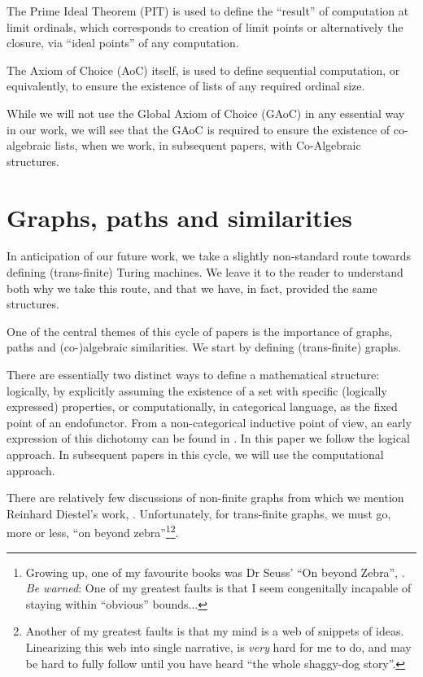 \documentclass[a4paper,openany]{amsart}
\begin{document}
The Prime Ideal Theorem (PIT) is used to define the ``result'' of computation at
limit ordinals, which corresponds to creation of limit points or alternatively
the closure, via ``ideal points'' of any computation.

The Axiom of Choice (AoC) itself, is used to define sequential computation, or
equivalently, to ensure the existence of lists of any required ordinal size.

While we will not use the Global Axiom of Choice (GAoC) in any essential way in
our work, we will see that the GAoC is required to ensure the existence of
co-algebraic lists, when we work, in subsequent papers, with Co-Algebraic
structures.

\section{Graphs, paths and similarities}

In anticipation of our future work, we take a slightly non-standard route towards defining
(trans-finite) Turing machines. We leave it to the reader to understand both why we take
this route, and that we have, in fact, provided the same structures.

One of the central themes of this cycle of papers is the importance of graphs, paths and
(co-)algebraic similarities. We start by defining (trans-finite) graphs.

There are essentially two distinct ways to define a mathematical structure: logically, by
explicitly assuming the existence of a set with specific (logically expressed) properties,
or computationally, in categorical language, as the fixed point of an endofunctor. From a
non-categorical inductive point of view, an early expression of this dichotomy can be
found in \cite[page 1]{moschovakis1974induction}. In this paper we follow the logical
approach. In subsequent papers in this cycle, we will use the computational approach.

There are relatively few discussions of non-finite graphs from which we mention Reinhard
Diestel's work, \cite{diestel2006graphTheory, diestel1990infiniteGraphTheory}.
Unfortunately, for trans-finite graphs, we must go, more or less, ``on beyond
zebra''\footnote{Growing up, one of my favourite books was Dr Seuss' ``On beyond Zebra'',
\cite{seuss1955onBeyondZebra}. \emph{Be warned}: One of my greatest faults is that I seem
congenitally incapable of staying within ``obvious'' bounds...}\footnote{Another of my
greatest faults is that my mind is a web of snippets of ideas. Linearizing this web into
single narrative, is \emph{very} hard for me to do, and may be hard to fully follow until 
you have heard ``the whole shaggy-dog story''.}.
\end{document}
